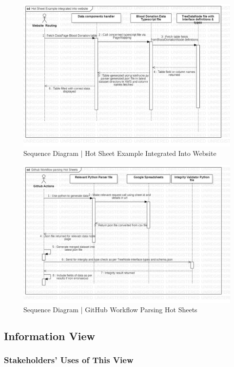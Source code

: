 \begin{figure}[H]
  \centering
  \includegraphics[width=\linewidth]{img/sequence-diagram-2.jpg}
  \caption{Sequence Diagram | Hot Sheet Example Integrated Into Website}
\end{figure}

\begin{figure}[H]
  \centering
  \includegraphics[width=\linewidth]{img/sequence-diagram-3.jpg}
  \caption{Sequence Diagram | GitHub Workflow Parsing Hot Sheets}
\end{figure}

\subsection{Information View}

\subsubsection{Stakeholders' Uses of This View}

